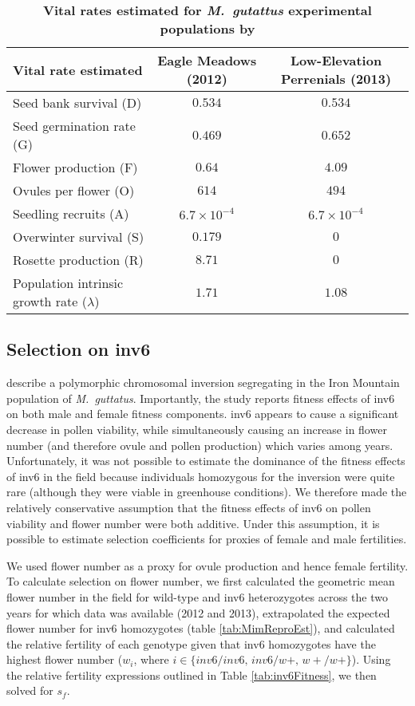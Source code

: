 \documentclass[11pt]{article}
\begin{document}
\begin{table}[htbp]
 \centering
 \caption{\bf Vital rates estimated for {\itshape M.~gutattus} experimental populations by \citet{PetersonEtAl2016}}
\label{tab:MimDemData}
\begin{tabular}{lcc}
 \toprule
 Vital rate estimated &  Eagle Meadows (2012) & Low-Elevation Perrenials (2013)\\ \hline
 Seed bank survival (D) & $0.534$ & $0.534$ \\
 Seed germination rate (G) & $0.469$ & $0.652$ \\
 Flower production (F) & $0.64$ & $4.09$ \\
 Ovules per flower (O) & $614$ & $494$ \\
 Seedling recruits (A) & $6.7 \times 10^{-4}$ & $6.7 \times 10^{-4}$ \\
 Overwinter survival (S) & $0.179$ & $0$ \\
 Rosette production (R) & $8.71$ & $0$ \\
\hline
 Population intrinsic growth rate ($\lambda$) & $1.71$ & $1.08$ \\
 \hline
\end{tabular}
\end{table}


\subsection*{Selection on inv6}

\citet{LeeKelly2015} describe a polymorphic chromosomal inversion segregating in the Iron Mountain population of {\itshape M.~guttatus}. Importantly, the study reports fitness effects of inv6 on both male and female fitness components. inv6 appears to cause a significant decrease in pollen viability, while simultaneously causing an increase in flower number (and therefore ovule and pollen production) which varies among years. Unfortunately, it was not possible to estimate the dominance of the fitness effects of inv6 in the field because individuals homozygous for the inversion were quite rare (although they were viable in greenhouse conditions). We therefore made the relatively conservative assumption that the fitness effects of inv6 on pollen viability and flower number were both additive. Under this assumption, it is possible to estimate selection coefficients for proxies of female and male fertilities. 

We used flower number as a proxy for ovule production and hence female fertility. To calculate selection on flower number, we first calculated the geometric mean flower number in the field for wild-type and inv6 heterozygotes across the two years for which data was available (2012 and 2013), extrapolated the expected flower number for inv6 homozygotes (table \ref{tab:MimReproEst}), and calculated the relative fertility of each genotype given that inv6 homozygotes have the highest flower number ($w_i$, where $i \in \{inv6/inv6,\, inv6/w+,\, w+/w+\}$). Using the relative fertility expressions outlined in Table \ref{tab:inv6Fitness}, we then solved for $s_f$. 
\end{document}

